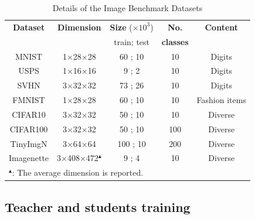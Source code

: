 \begin{table}[ht] %
    \caption{Details of the Image Benchmark Datasets}
    \centering
    \begin{tabular}{c|c|c|c|c}
        \hline \textbf{Dataset} & \textbf{Dimension} & \textbf{Size} ($\times\text{10}^\text{3}$) & \textbf{No.} & \textbf{Content}  \\
        & & train; test & \textbf{classes} & \\
        \hline
        MNIST      &                    1$\times$28$\times$28 &           \phantom{0}60 ; 10\phantom{0} & \phantom{0}10 & Digits \\
        USPS       &                    1$\times$16$\times$16 & \phantom{00}9 ; \phantom{0}2\phantom{0} & \phantom{0}10 & Digits \\
        SVHN       &                    3$\times$32$\times$32 &           \phantom{0}73 ; 26\phantom{0} & \phantom{0}10 & Digits \\
        FMNIST     &                    1$\times$28$\times$28 &           \phantom{0}60 ; 10\phantom{0} & \phantom{0}10 & Fashion items \\
        \hline
        CIFAR10    &                    3$\times$32$\times$32 &           \phantom{0}50 ; 10\phantom{0} & \phantom{0}10 & Diverse \\
        CIFAR100   &                    3$\times$32$\times$32 &           \phantom{0}50 ; 10\phantom{0} &           100 & Diverse \\
        TinyImgN   &                    3$\times$64$\times$64 &                     100 ; 10\phantom{0} &           200 & Diverse \\
        Imagenette & 3$\times$408$\times$472$^\blacktriangle$ & \phantom{00}9 ; \phantom{0}4\phantom{0} & \phantom{0}10 & Diverse \\
        \hline
        \multicolumn{5}{l}{$^\blacktriangle$: The average dimension is reported.} \\
    \end{tabular}
    \label{tab:appendix-training-datasets}
\end{table}


\subsection{Teacher and students training} \label{ssec:app01-teacherstudents}
